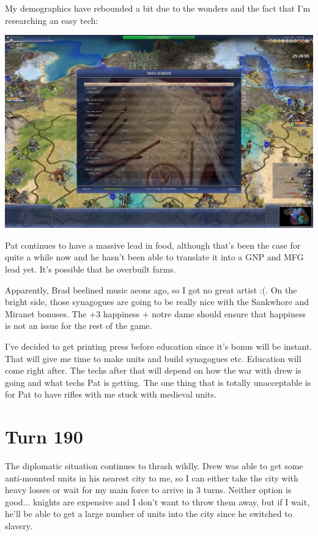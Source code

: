 \documentclass[10pt]{article}
\begin{document}
My demographics have rebounded a bit due to the wonders and the fact that I'm researching an easy tech:

\includegraphics[width=1.0\textwidth]{turn189-2}

Pat continues to have a massive lead in food, although that's been the
case for quite a while now and he hasn't been able to translate it
into a GNP and MFG lead yet. It's possible that he overbuilt farms.

Apparently, Brad beelined music aeons ago, so I got no great artist
:(. On the bright side, those synagogues are going to be really nice
with the Sankwhore and Miranet bonuses. The +3 happiness + notre dame
should ensure that happiness is not an issue for the rest of the game.

I've decided to get printing press before education since it's bonus
will be instant. That will give me time to make units and build
synagogues etc. Education will come right after. The techs after that
will depend on how the war with drew is going and what techs Pat is
getting. The one thing that is totally unacceptable is for Pat to have
rifles with me stuck with medieval units.

\section*{Turn 190}

The diplomatic situation continues to thrash wildly. Drew was able to
get some anti-mounted units in his nearest city to me, so I can either
take the city with heavy losses or wait for my main force to arrive in
3 turns. Neither option is good... knights are expensive and I don't
want to throw them away, but if I wait, he'll be able to get a large
number of units into the city since he switched to slavery.
\end{document}
